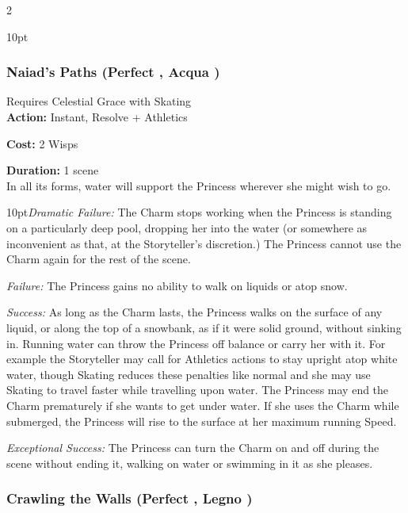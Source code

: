 \begin{multicols}{2}
\begin{myindentpar}{10pt}
\end{myindentpar}


\subsubsection*{Naiad's Paths (Perfect \textbullet\textbullet\textbullet, Acqua \textbullet\textbullet)}
\noindent Requires Celestial Grace with Skating\\

\noindent \textbf{Action:} Instant, Resolve + Athletics

\noindent \textbf{Cost:} 2 Wisps

\noindent \textbf{Duration:} 1 scene\\

\noindent In all its forms, water will support the Princess wherever she might wish to go.

\begin{myindentpar}{10pt}\emph{Dramatic Failure:} The Charm stops working when the Princess is standing on a particularly deep pool, dropping her into the water (or somewhere as inconvenient as that, at the Storyteller's discretion.) The Princess cannot use the Charm again for the rest of the scene.
 
\emph{Failure:} The Princess gains no ability to walk on liquids or atop snow.

\emph{Success:} As long as the Charm lasts, the Princess walks on the surface of any liquid, or along the top of a snowbank, as if it were solid ground, without sinking in. Running water can throw the Princess off balance or carry her with it. For example the Storyteller may call for Athletics actions to stay upright atop white water, though Skating reduces these penalties like normal and she may use Skating to travel faster while travelling upon water. The Princess may end the Charm prematurely if she wants to get under water. If she uses the Charm while submerged, the Princess will rise to the surface at her maximum running Speed.

\emph{Exceptional Success:} The Princess can turn the Charm on and off during the scene without ending it, walking on water or swimming in it as she pleases.\end{myindentpar}

\subsubsection*{Crawling the Walls (Perfect \textbullet\textbullet\textbullet, Legno \textbullet\textbullet)}


\end{multicols}
